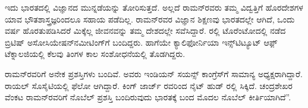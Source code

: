 ಇದು ಭಾರತದಲ್ಲಿ ವಿಜ್ಞಾನದ ಮುನ್ನಡೆಯನ್ನು ತೋರಿಸುತ್ತದೆ. ಅಲ್ಲದೆ ರಾಮನ್‍ರವರು ತಮ್ಮ ವಿದ್ವತ್ತಿಗೆ ಹೊರದೇಶಗಳ ಯಾವ ಭೌತಶಾಸ್ತ್ರಜ್ಞರಿಂದಲೂ ಸಹಾಯ ಪಡೆದಿಲ್ಲ. ರಾಮನ್‍ರವರ ವಿಜ್ಞಾನ ಶಿಕ್ಷಣವು ಭಾರತದಲ್ಲೇ ಆಗಿದೆ, ಒಂದು ವರ್ಷ ಹೊರತುಪಡಿಸಿದರೆ ಮಿಕ್ಕೆಲ್ಲ ಜೀವನವನ್ನು ತಮ್ಮ ದೇಶದಲ್ಲೇ ಸವೆಸಿದ್ದಾರೆ. ರಲ್ಲಿ ಟೊರೆಂಟೋದಲ್ಲಿ ನಡೆದ ಬ್ರಿಟಿಷ್ ಅಸೋಸಿಯೇಷನ್‍ನ\break ಮೀಟಿಂಗ್‍ಗೆ ಬಂದಿದ್ದರು. ಹಾಗೆಯೇ ಕ್ಯಾಲಿಫೋರ್ನಿಯಾ ಇನ್ಸ್‌ಟಿಟ್ಯೂಟ್ ಆಫ಼್ ಟೆಕ್ನಾಲಜಿಯಲ್ಲಿ ಕೆಲವು ತಿಂಗಳ ಕಾಲ ಸಂಶೋಧನೆಯಲ್ಲಿ ತೊಡಗಿದ್ದರು.

ರಾಮನ್‍ರವರಿಗೆ ಅನೇಕ ಪ್ರಶಸ್ತಿಗಳು ಬಂದಿವೆ. ಅವರು ಇಂಡಿಯನ್ ಸಯನ್ಸ್ ಕಾಂಗ್ರೆಸ್‍ಗೆ ಸಾಮಾನ್ಯ ಅಧ್ಯಕ್ಷರಾಗಿದ್ದಾರೆ. ರಾಯಲ್ ಸೊಸೈಟಿಯಲ್ಲಿ ಫೆಲೋ ಆಗಿದ್ದಾರೆ. ಕಿಂಗ್ ಜಾರ್ಜ್ ರವರಿಂದ ನೈಟ್ ಹುಡ್ ರಲ್ಲಿ ಸಿಕ್ಕಿದೆ. ಚಂದ್ರಶೇಖರ ವೆಂಕಟ ರಾಮನ್‍ರವರಿಗೆ ನೊಬೆಲ್ ಪ್ರಶಸ್ತಿ ಬಂದಿರುವುದು ಭಾರತಕ್ಕೆ ಬಂದ ಮೊದಲ ನೊಬೆಲ್ ಕೀರ್ತಿಯಾಗಿದೆ”.

